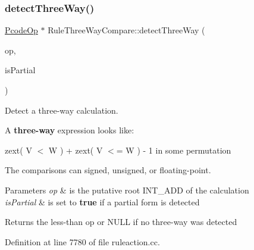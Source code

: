 \subsubsection{\texorpdfstring{detectThreeWay()}{detectThreeWay()}}
{\footnotesize\ttfamily \mbox{\hyperlink{class_pcode_op}{Pcode\+Op}} $\ast$ Rule\+Three\+Way\+Compare\+::detect\+Three\+Way (\begin{DoxyParamCaption}\item[{\mbox{\hyperlink{class_pcode_op}{Pcode\+Op}} $\ast$}]{op,  }\item[{bool \&}]{is\+Partial }\end{DoxyParamCaption})\hspace{0.3cm}{\ttfamily [static]}}



Detect a three-\/way calculation. 

A {\bfseries{three-\/way}} expression looks like\+:
\begin{DoxyItemize}
\item {\ttfamily zext( V $<$ W ) + zext( V $<$= W ) -\/ 1} in some permutation
\end{DoxyItemize}

The comparisons can signed, unsigned, or floating-\/point. 
\begin{DoxyParams}{Parameters}
{\em op} & is the putative root I\+N\+T\+\_\+\+A\+DD of the calculation \\
\hline
{\em is\+Partial} & is set to {\bfseries{true}} if a partial form is detected \\
\hline
\end{DoxyParams}
\begin{DoxyReturn}{Returns}
the less-\/than op or N\+U\+LL if no three-\/way was detected 
\end{DoxyReturn}


Definition at line 7780 of file ruleaction.\+cc.

